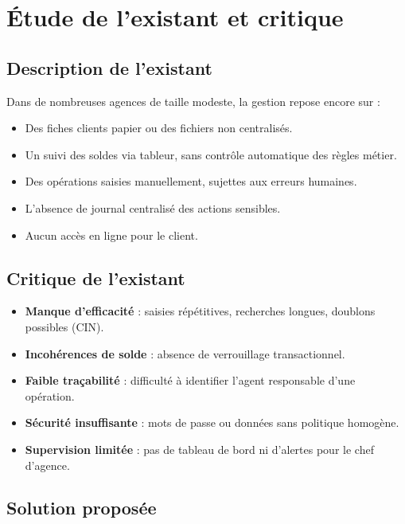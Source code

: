 \section{Étude de l'existant et critique}

\subsection{Description de l'existant}

Dans de nombreuses agences de taille modeste, la gestion repose encore sur :
\begin{itemize}[leftmargin=*]
    \item Des fiches clients papier ou des fichiers non centralisés.
    \item Un suivi des soldes via tableur, sans contrôle automatique des règles métier.
    \item Des opérations saisies manuellement, sujettes aux erreurs humaines.
    \item L'absence de journal centralisé des actions sensibles.
    \item Aucun accès en ligne pour le client.
\end{itemize}

\subsection{Critique de l'existant}

\begin{itemize}[leftmargin=*]
    \item \textbf{Manque d'efficacité} : saisies répétitives, recherches longues, doublons possibles (CIN).
    \item \textbf{Incohérences de solde} : absence de verrouillage transactionnel.
    \item \textbf{Faible traçabilité} : difficulté à identifier l'agent responsable d'une opération.
    \item \textbf{Sécurité insuffisante} : mots de passe ou données sans politique homogène.
    \item \textbf{Supervision limitée} : pas de tableau de bord ni d'alertes pour le chef d'agence.
\end{itemize}

\subsection{Solution proposée}

